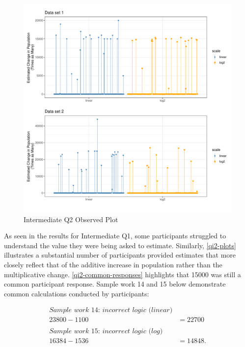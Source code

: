 \documentclass[print]{nuthesis}
\begin{document}
\begin{figure}[tbp]

{\centering \includegraphics[width=1\linewidth,]{thesis_files/figure-latex/qi2-plots-1} 

}

\caption{Intermediate Q2 Observed Plot}\label{fig:qi2-plots}
\end{figure}

As seen in the results for Intermediate Q1, some participants struggled to understand the value they were being asked to estimate.
Similarly, \cref{qi2-plots} illustrates a substantial number of participants provided estimates that more closely reflect that of the additive increase in population rather than the multiplicative change.
\cref{qi2-common-responses} highlights that 15000 was still a common participant response.
Sample work 14 and 15 below demonstrate common calculations conducted by participants:

\begin{align}
\textit{Sample work 14: incorrect logic (linear)} \nonumber\\
23800-1100&=22700 \nonumber\\   
\nonumber \\
\textit{Sample work 15: incorrect logic (log)} \nonumber\\
16384-1536&=14848. \nonumber
\end{align}
\end{document}
